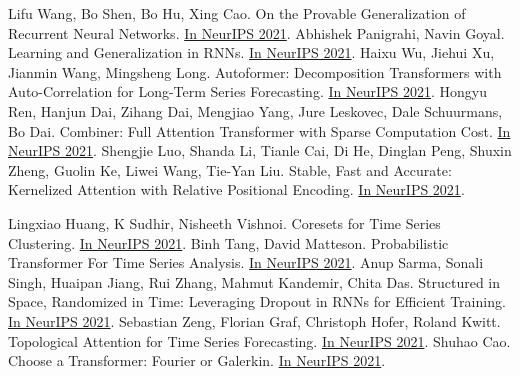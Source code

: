 \documentclass[b5paper,xelatex,ja=standard,10pt]{bxjsarticle}
\begin{document}
\begin{thebibliography}{99}
     Lifu Wang, Bo Shen, Bo Hu, Xing Cao. On the Provable Generalization of Recurrent Neural Networks. {\href{https://proceedings.neurips.cc/paper/2021/hash/a928731e103dfc64c0027fa84709689e-Abstract.html}{In NeurIPS 2021}}.
     Abhishek Panigrahi, Navin Goyal. Learning and Generalization in RNNs. {\href{https://proceedings.neurips.cc/paper/2021/hash/b04c387c8384ca083a71b8da516f65f6-Abstract.html}{In NeurIPS 2021}}.
     Haixu Wu, Jiehui Xu, Jianmin Wang, Mingsheng Long. Autoformer: Decomposition Transformers with Auto-Correlation for Long-Term Series Forecasting. {\href{https://proceedings.neurips.cc/paper/2021/hash/bcc0d400288793e8bdcd7c19a8ac0c2b-Abstract.html}{In NeurIPS 2021}}.
     Hongyu Ren, Hanjun Dai, Zihang Dai, Mengjiao Yang, Jure Leskovec, Dale Schuurmans, Bo Dai. Combiner: Full Attention Transformer with Sparse Computation Cost. {\href{https://proceedings.neurips.cc/paper/2021/hash/bd4a6d0563e0604510989eb8f9ff71f5-Abstract.html}{In NeurIPS 2021}}.
     Shengjie Luo, Shanda Li, Tianle Cai, Di He, Dinglan Peng, Shuxin Zheng, Guolin Ke, Liwei Wang, Tie-Yan Liu. Stable, Fast and Accurate: Kernelized Attention with Relative Positional Encoding. {\href{https://proceedings.neurips.cc/paper/2021/hash/c0f168ce8900fa56e57789e2a2f2c9d0-Abstract.html}{In NeurIPS 2021}}.

     Lingxiao Huang, K Sudhir, Nisheeth Vishnoi. Coresets for Time Series Clustering. {\href{https://proceedings.neurips.cc/paper/2021/hash/c115ba9e04ab27fbbb664f932112246d-Abstract.html}{In NeurIPS 2021}}.
     Binh Tang, David Matteson. Probabilistic Transformer For Time Series Analysis. {\href{https://proceedings.neurips.cc/paper/2021/hash/c68bd9055776bf38d8fc43c0ed283678-Abstract.html}{In NeurIPS 2021}}.
     Anup Sarma, Sonali Singh, Huaipan Jiang, Rui Zhang, Mahmut Kandemir, Chita Das. Structured in Space, Randomized in Time: Leveraging Dropout in RNNs for Efficient Training. {\href{https://proceedings.neurips.cc/paper/2021/hash/cd81cfd0a3397761fac44ddbe5ec3349-Abstract.html}{In NeurIPS 2021}}.
     Sebastian Zeng, Florian Graf, Christoph Hofer, Roland Kwitt. Topological Attention for Time Series Forecasting. {\href{https://proceedings.neurips.cc/paper/2021/hash/d062f3e278a1fbba2303ff5a22e8c75e-Abstract.html}{In NeurIPS 2021}}.
     Shuhao Cao. Choose a Transformer: Fourier or Galerkin. {\href{https://proceedings.neurips.cc/paper/2021/hash/d0921d442ee91b896ad95059d13df618-Abstract.html}{In NeurIPS 2021}}.


\end{thebibliography}
\end{document}
